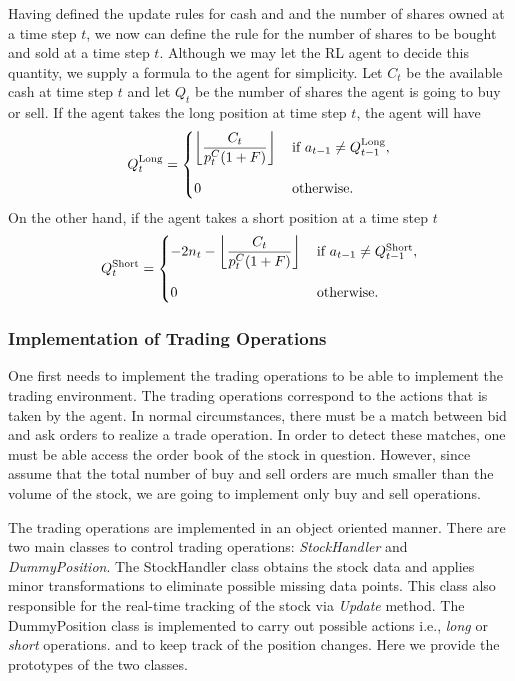 \documentclass[twocolumn,aps,pra,superscriptaddress,nofootinbib,longbibliography]{revtex4-2}
\DeclarePairedDelimiter\floor{\lfloor}{\rfloor}
\begin{document}
Having defined the update rules for cash and and the number of shares owned at a time step \(t\), we now can define the rule for the number of shares to be bought and sold at a time step \(t\). Although we may let the RL agent to decide this quantity, we supply a formula to the agent for simplicity.  Let \(C_t\) be the available cash at time step \(t\) and let \(Q_t\) be the number of shares the agent is going to buy or sell. If the agent takes the long position at time step \(t\), the agent will have 
\begin{equation}\label{eq:longaction}
    Q_t^{\text{Long}} =
    \begin{cases}
        \floor*{\dfrac{C_{t}}{p_t^C (1 + F)}} \, &\text{if} \,\, a_{t-1} \neq Q_{t-1}^{\text{Long}}, \\[15pt]
        0 \, &\text{otherwise}.
    \end{cases}
\end{equation} 
On the other hand, if the agent takes a short position at a time step \(t\)
\begin{equation}
    Q_t^{\text{Short}} =
    \begin{cases}
        -2 n_t - \floor*{\dfrac{C_{t}}{p_t^C (1 + F)}} \, &\text{if} \,\, a_{t-1} \neq Q_{t-1}^{\text{Short}}, \\[15pt]
        0 \, &\text{otherwise}.
    \end{cases}
\end{equation} 



\subsubsection{Implementation of Trading Operations}



One first needs to implement the trading operations to be able to implement the trading environment. The trading operations correspond to the actions that is taken by the agent. In normal circumstances, there must be a match between bid and ask orders to realize a trade operation. In order to detect these matches, one must be able access the order book of the stock in question. However, since assume that the total number of buy and sell orders are much smaller than the volume of the stock, we are going to implement only buy and sell operations. 

The trading operations are implemented in an object oriented manner. There are two main classes to control trading operations: \textit{StockHandler} and \textit{DummyPosition}. The StockHandler class obtains the stock data and applies minor transformations to eliminate possible missing data points. This class also responsible for the real-time tracking of the stock via \textit{Update} method. The DummyPosition class is implemented to carry out possible actions i.e., \textit{long} or \textit{short} operations. and to keep track of the position changes. Here we provide the prototypes of the two classes. 
\end{document}
